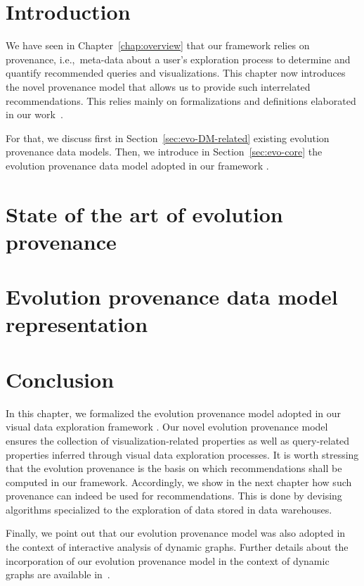 \section{Introduction}
\sloppy


We have seen in Chapter~\ref{chap:overview} that our framework \framework{} relies on provenance, i.e.,~meta-data about a user's exploration process to determine and quantify recommended queries and visualizations. This chapter now introduces the novel provenance model that allows us to provide such interrelated recommendations.   
This relies mainly on formalizations and definitions elaborated in our work~\cite{Houssem:17:tapp,Houssem:19:adbis}.

For that, we discuss first in Section~\ref{sec:evo-DM-related} existing evolution provenance data models. Then, we introduce in Section~\ref{sec:evo-core} the evolution provenance data model adopted in our framework \framework{}.  

\section{State of the art of evolution provenance}


\section{Evolution provenance data model representation}



%


\section{Conclusion}
In this chapter, we formalized the evolution provenance model adopted in our visual data exploration framework \framework{}. 
Our novel evolution provenance model ensures the collection of visualization-related properties as well as query-related properties inferred through visual data exploration processes.
It is worth stressing that the evolution provenance is the basis on which recommendations shall be computed in our framework. Accordingly, we show in the next chapter how such provenance can indeed be used for recommendations.
This is done by devising algorithms specialized to the exploration of data stored in data warehouses.


Finally, we point out that our evolution provenance model was also adopted in the context of interactive analysis of dynamic graphs. 
 Further details about the incorporation of our evolution provenance model in the context of dynamic graphs are available in~\cite{Bruder2019}.




